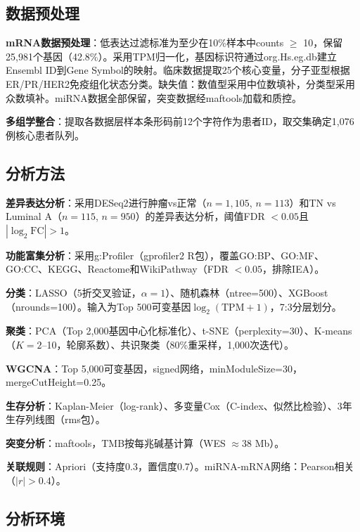 \documentclass[12pt,a4paper]{ctexart}
\begin{document}
\subsection{数据预处理}

\textbf{mRNA数据预处理}：低表达过滤标准为至少在10\%样本中counts $\geq$ 10，保留25,981个基因（42.8\%）。采用TPM归一化，基因标识符通过org.Hs.eg.db建立Ensembl ID到Gene Symbol的映射。临床数据提取25个核心变量，分子亚型根据ER/PR/HER2免疫组化状态分类。缺失值：数值型采用中位数填补，分类型采用众数填补。miRNA数据全部保留，突变数据经maftools\cite{mayakonda2018maftools}加载和质控。

\textbf{多组学整合}：提取各数据层样本条形码前12个字符作为患者ID，取交集确定1,076例核心患者队列。

\subsection{分析方法}

\textbf{差异表达分析}：采用DESeq2\cite{love2014moderated}进行肿瘤vs正常（$n=1,105$, $n=113$）和TN vs Luminal A（$n=115$, $n=950$）的差异表达分析，阈值FDR $<0.05$且$|\log_2\text{FC}|>1$。

\textbf{功能富集分析}：采用g:Profiler（gprofiler2 R包）\cite{kolberg2023gprofiler}，覆盖GO:BP、GO:MF、GO:CC、KEGG、Reactome和WikiPathway（FDR $<0.05$，排除IEA）。

\textbf{分类}：LASSO（5折交叉验证，$\alpha=1$）、随机森林（ntree=500）、XGBoost（nrounds=100）。输入为Top 500可变基因$\log_2(\text{TPM}+1)$，7:3分层划分。

\textbf{聚类}：PCA（Top 2,000基因中心化标准化）、t-SNE（perplexity=30）、K-means（$K=2$--10，轮廓系数）、共识聚类（80\%重采样，1,000次迭代）\cite{wilkerson2010consensus}。

\textbf{WGCNA}\cite{langfelder2008wgcna}：Top 5,000可变基因，signed网络，minModuleSize=30，mergeCutHeight=0.25。

\textbf{生存分析}：Kaplan-Meier（log-rank）、多变量Cox（C-index、似然比检验）、3年生存列线图（rms包）。

\textbf{突变分析}：maftools\cite{mayakonda2018maftools}，TMB按每兆碱基计算（WES $\approx$38 Mb）。

\textbf{关联规则}：Apriori（支持度0.3，置信度0.7）。miRNA-mRNA网络：Pearson相关（$|r|>0.4$）。

\subsection{分析环境}
\end{document}
